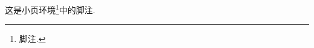 \documentclass[nofonts]{ctexart}
\begin{document}
\begin{minipage}{8em}
	这是小页环境\footnote{脚注.}中的脚注.
\end{minipage}
\end{document}
